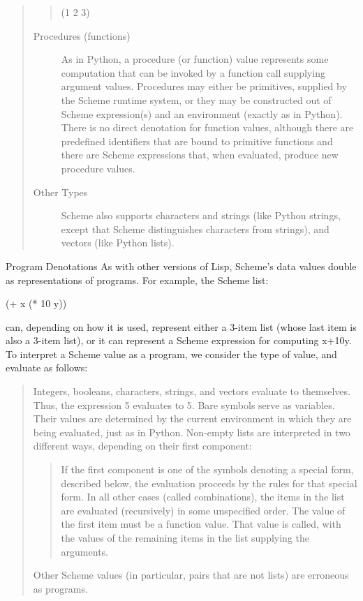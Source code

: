 \documentclass[letterpaper,10pt,dvipdfmx]{sphinxmanual}
\begin{document}
\begin{quote}
\begin{quote}
(1 2 3)
\end{quote}
\begin{description}
\item[{Procedures (functions)}] \leavevmode
As in Python, a procedure (or function) value represents some computation that can be invoked by a function call supplying argument values. Procedures may either be primitives, supplied by the Scheme runtime system, or they may be constructed out of Scheme expression(s) and an environment (exactly as in Python). There is no direct denotation for function values, although there are predefined identifiers that are bound to primitive functions and there are Scheme expressions that, when evaluated, produce new procedure values.

\item[{Other Types}] \leavevmode
Scheme also supports characters and strings (like Python strings, except that Scheme distinguishes characters from strings), and vectors (like Python lists).

\end{description}
\end{quote}

Program Denotations As with other versions of Lisp, Scheme's data values double as representations of programs. For example, the Scheme list:

(+ x (* 10 y))

can, depending on how it is used, represent either a 3-item list (whose last item is also a 3-item list), or it can represent a Scheme expression for computing x+10y. To interpret a Scheme value as a program, we consider the type of value, and evaluate as follows:
\begin{quote}

Integers, booleans, characters, strings, and vectors evaluate to themselves. Thus, the expression 5 evaluates to 5.
Bare symbols serve as variables. Their values are determined by the current environment in which they are being evaluated, just as in Python.
Non-empty lists are interpreted in two different ways, depending on their first component:
\begin{quote}

If the first component is one of the symbols denoting a special form, described below, the evaluation proceeds by the rules for that special form.
In all other cases (called combinations), the items in the list are evaluated (recursively) in some unspecified order. The value of the first item must be a function value. That value is called, with the values of the remaining items in the list supplying the arguments.
\end{quote}

Other Scheme values (in particular, pairs that are not lists) are erroneous as programs.
\end{quote}
\end{document}
